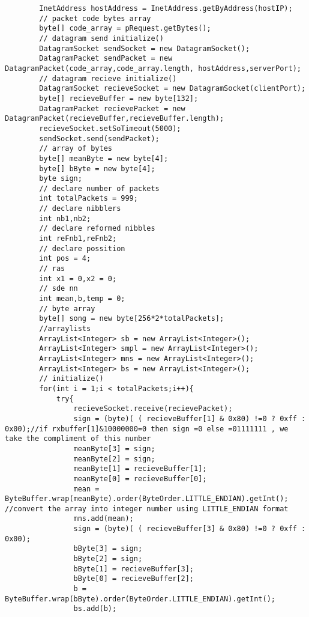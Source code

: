 \documentclass{article}
\begin{document}
\begin{lstlisting}
        InetAddress hostAddress = InetAddress.getByAddress(hostIP);
        // packet code bytes array
        byte[] code_array = pRequest.getBytes();
        // datagram send initialize()
        DatagramSocket sendSocket = new DatagramSocket();
        DatagramPacket sendPacket = new DatagramPacket(code_array,code_array.length, hostAddress,serverPort);
        // datagram recieve initialize()
        DatagramSocket recieveSocket = new DatagramSocket(clientPort);
        byte[] recieveBuffer = new byte[132];
        DatagramPacket recievePacket = new DatagramPacket(recieveBuffer,recieveBuffer.length);
        recieveSocket.setSoTimeout(5000);
        sendSocket.send(sendPacket);
        // array of bytes
        byte[] meanByte = new byte[4];
        byte[] bByte = new byte[4];
        byte sign;
        // declare number of packets
        int totalPackets = 999;
        // declare nibblers
        int nb1,nb2;
        // declare reformed nibbles
        int reFnb1,reFnb2;
        // declare possition
        int pos = 4;
        // ras
        int x1 = 0,x2 = 0;
        // sde nn
        int mean,b,temp = 0;
        // byte array
        byte[] song = new byte[256*2*totalPackets];
        //arraylists
        ArrayList<Integer> sb = new ArrayList<Integer>();
        ArrayList<Integer> smpl = new ArrayList<Integer>();
        ArrayList<Integer> mns = new ArrayList<Integer>();
        ArrayList<Integer> bs = new ArrayList<Integer>();
        // initialize()
        for(int i = 1;i < totalPackets;i++){
            try{
                recieveSocket.receive(recievePacket);
                sign = (byte)( ( recieveBuffer[1] & 0x80) !=0 ? 0xff : 0x00);//if rxbuffer[1]&10000000=0 then sign =0 else =01111111 , we take the compliment of this number
                meanByte[3] = sign;
                meanByte[2] = sign;
                meanByte[1] = recieveBuffer[1];
                meanByte[0] = recieveBuffer[0];
                mean = ByteBuffer.wrap(meanByte).order(ByteOrder.LITTLE_ENDIAN).getInt(); //convert the array into integer number using LITTLE_ENDIAN format
                mns.add(mean);
                sign = (byte)( ( recieveBuffer[3] & 0x80) !=0 ? 0xff : 0x00);
                bByte[3] = sign;
                bByte[2] = sign;
                bByte[1] = recieveBuffer[3];
                bByte[0] = recieveBuffer[2];
                b = ByteBuffer.wrap(bByte).order(ByteOrder.LITTLE_ENDIAN).getInt();
                bs.add(b);


\end{lstlisting}
\end{document}
